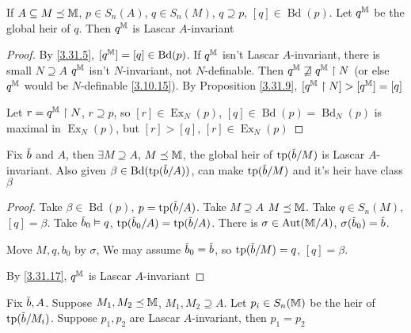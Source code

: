 \documentclass[11pt]{article}
\DeclareMathOperator{\Ex}{Ex}
\DeclareMathOperator{\Bd}{Bd}
\begin{document}
\begin{lemma}[]
\label{3.31.17}
If \(A\subseteq M\preceq\mathbb{M}\), \(p\in S_n(A)\), \(q\in S_n(M)\), \(q\supseteq p\), \([q]\in\Bd(p)\). Let \(q^{\mathbb{M}}\) be the
global heir of \(q\). Then \(q^{\mathbb{M}}\) is Lascar \(A\)-invariant
\end{lemma}

\begin{proof}
By \ref{3.31.5}, \([q^{\M}]=[q]\in\Bd(p)\). If \(q^{\mathbb{M}}\) isn't Lascar \(A\)-invariant, there is
small \(N\supseteq A\) \(q^{\mathbb{M}}\) isn't \(N\)-invariant, not \(N\)-definable.
Then \(q^{\mathbb{M}}\not\sqsupseteq q^{\mathbb{M}}\upharpoonright N\) (or else \(q^{\mathbb{M}}\) would be \(N\)-definable \ref{3.10.15}). By Proposition \ref{3.31.9}, \([q^{\mathbb{M}}\upharpoonright N]>[q^{\mathbb{M}}]=[q]\)

Let \(r=q^{\mathbb{M}}\upharpoonright N\), \(r\supseteq p\), so \([r]\in\Ex_N(p)\), \([q]\in\Bd(p)=\Bd_N(p)\) is maximal
in \(\Ex_N(p)\), but \([r]>[q]\), \([r]\in\Ex_N(p)\)
\end{proof}

\begin{lemma}[]
\label{3.31.18}
Fix \(\barb\) and \(A\), then \(\exists M\supseteq A\), \(M\preceq\mathbb{M}\), the global heir of \(\tp(\barb/M)\) is
Lascar \(A\)-invariant. Also given \(\beta\in\Bd(\tp(\barb/A))\), can make \(\tp(\barb/M)\) and it's
heir have class \(\beta\)
\end{lemma}

\begin{proof}
Take \(\beta\in\Bd(p)\), \(p=\tp(\barb/A)\). Take \(M\supseteq A\) \(M\preceq\mathbb{M}\). Take \(q\in S_n(M)\), \([q]=\beta\).
Take \(\barb_0\vDash q\), \(\tp(\barb_0/A)=\tp(\barb/A)\). There
is \(\sigma\in\operatorname{\text{Aut}}(\mathbb{M}/A)\), \(\sigma(\barb_0)=\barb\).

Move \(M,q,b_0\) by \(\sigma\), We may assume \(\barb_0=\barb\), so \(\tp(\barb/M)=q\), \([q]=\beta\).

By \ref{3.31.17}, \(q^{\mathbb{M}}\) is Lascar \(A\)-invariant
\end{proof}

\begin{lemma}[]
\label{3.31.19}
Fix \(\barb,A\). Suppose \(M_1,M_2\preceq\mathbb{M}\), \(M_1,M_2\supseteq A\). Let \(p_i\in S_n(\mathbb{M})\) be the heir
of \(\tp(\barb/M_i)\). Suppose \(p_1,p_2\) are Lascar \(A\)-invariant, then \(p_1=p_2\)
\end{lemma}
\end{document}
